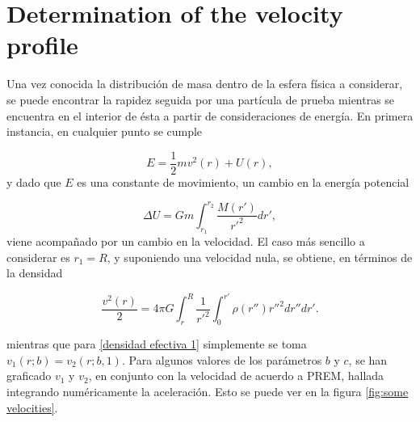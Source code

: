 \documentclass[aps,twocolumn,showpacs,preprintnumbers]{revtex4}
\begin{document}
\section{Determination of the velocity profile}\label{velocity section}
    
       Una vez conocida la distribución de masa dentro de la esfera física a considerar, se puede encontrar la rapidez seguida por una partícula de prueba mientras se encuentra en el interior de ésta a partir de consideraciones de energía. En primera instancia, en cualquier punto se cumple
            
            \begin{equation*}
                E = \frac{1}{2} m v^2(r) + U(r),
            \end{equation*}
        y dado que $E$ es una constante de movimiento, un cambio en la energía potencial
            
            \begin{equation*}
                \Delta U = G m \int_{r_1}^{r_2} \frac{M(r')}{{r'}^2} dr'  ,
            \end{equation*}
        viene acompañado por un cambio en la velocidad. El caso más sencillo a considerar es $r_1 = R$, y suponiendo una velocidad nula, se obtiene, en términos de la densidad 
        
        \begin{equation}
            \frac{v^2(r)}{2} = 4 \pi G \int_{r}^{R} \frac{1}{{r'}^2} \int_{0}^{r'} \rho(r'') {r''}^2 dr'' dr' .
            \label{perfil de v}
        \end{equation}
    
    \begin{comment}
    Con el perfil de densidad \eqref{densidad efectiva 2},
    tras hacer la doble integral,
    
    \begin{equation}
        v_2(r;b,c) = \left[ \frac{8\pi G \Bar{\rho}}{3 c_b} \sum_{k=0}^{\infty} \binom{b}{k} (-c)^k R^{-k} \frac{R^{k+2} - r^{k+2}}{(k+2)(k+3)}  \right]^{1/2},
        \label{velocidad efectiva 2}
    \end{equation}
    
    
    \end{comment}

    mientras que para \eqref{densidad efectiva 1} simplemente se toma $v_1(r;b) = v_2 (r;b,1)$. Para algunos valores de los parámetros $b$ y $c$, se han graficado $v_1$ y $v_2$, en conjunto con la velocidad de acuerdo a PREM, hallada integrando numéricamente la aceleración. Esto se puede ver en la figura \ref{fig:some velocities}.
    
\end{document}
